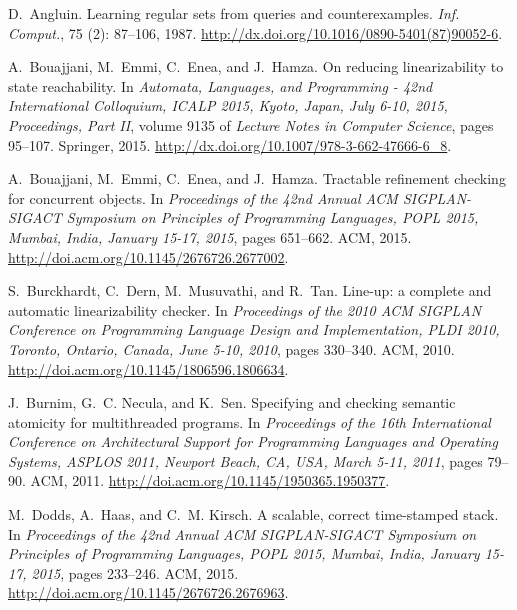 \documentclass[9pt,natbib,authoryear]{sigplanconf}
\begin{document}
\begin{thebibliography}{26}
D.~Angluin.
\newblock Learning regular sets from queries and counterexamples.
\newblock \emph{Inf. Comput.}, 75 (2): 87--106, 1987.
\newblock \url{http://dx.doi.org/10.1016/0890-5401(87)90052-6}.

A.~Bouajjani, M.~Emmi, C.~Enea, and J.~Hamza.
\newblock On reducing linearizability to state reachability.
\newblock In \emph{Automata, Languages, and Programming - 42nd International
  Colloquium, {ICALP} 2015, Kyoto, Japan, July 6-10, 2015, Proceedings, Part
  {II}}, volume 9135 of \emph{Lecture Notes in Computer Science}, pages
  95--107. Springer, 2015{}.
\newblock \url{http://dx.doi.org/10.1007/978-3-662-47666-6_8}.

A.~Bouajjani, M.~Emmi, C.~Enea, and J.~Hamza.
\newblock Tractable refinement checking for concurrent objects.
\newblock In \emph{Proceedings of the 42nd Annual {ACM} {SIGPLAN-SIGACT}
  Symposium on Principles of Programming Languages, {POPL} 2015, Mumbai, India,
  January 15-17, 2015}, pages 651--662. {ACM}, 2015{}.
\newblock \url{http://doi.acm.org/10.1145/2676726.2677002}.

S.~Burckhardt, C.~Dern, M.~Musuvathi, and R.~Tan.
\newblock Line-up: a complete and automatic linearizability checker.
\newblock In \emph{Proceedings of the 2010 {ACM} {SIGPLAN} Conference on
  Programming Language Design and Implementation, {PLDI} 2010, Toronto,
  Ontario, Canada, June 5-10, 2010}, pages 330--340. {ACM}, 2010.
\newblock \url{http://doi.acm.org/10.1145/1806596.1806634}.

J.~Burnim, G.~C. Necula, and K.~Sen.
\newblock Specifying and checking semantic atomicity for multithreaded
  programs.
\newblock In \emph{Proceedings of the 16th International Conference on
  Architectural Support for Programming Languages and Operating Systems,
  {ASPLOS} 2011, Newport Beach, CA, USA, March 5-11, 2011}, pages 79--90.
  {ACM}, 2011.
\newblock \url{http://doi.acm.org/10.1145/1950365.1950377}.

M.~Dodds, A.~Haas, and C.~M. Kirsch.
\newblock A scalable, correct time-stamped stack.
\newblock In \emph{Proceedings of the 42nd Annual {ACM} {SIGPLAN-SIGACT}
  Symposium on Principles of Programming Languages, {POPL} 2015, Mumbai, India,
  January 15-17, 2015}, pages 233--246. {ACM}, 2015.
\newblock \url{http://doi.acm.org/10.1145/2676726.2676963}.


\end{thebibliography}
\end{document}
